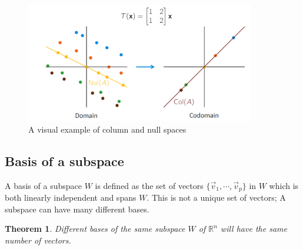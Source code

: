 \documentclass[11pt, a4paper]{article}
\newtheorem{theorem}{Theorem}
\begin{document}
\begin{figure}[h]
  \centerline{\includegraphics[width=10cm]{images/Subspaces.png}}
  \caption{A visual example of column and null spaces}
\end{figure}


\subsection{Basis of a subspace}
A basis of a subspace $W$ is defined as the set of vectors $\{ \vec{v}_1, \cdots, \vec{v}_p \}$ in $W$ which
is both linearly independent and spans $W$. This is not a unique set of vectors; A subspace can have
many different bases.

\begin{theorem}
  Different bases of the same subspace $W$ of $\mathbb{R}^n$ will have the same number of vectors.
\end{theorem}
\end{document}
